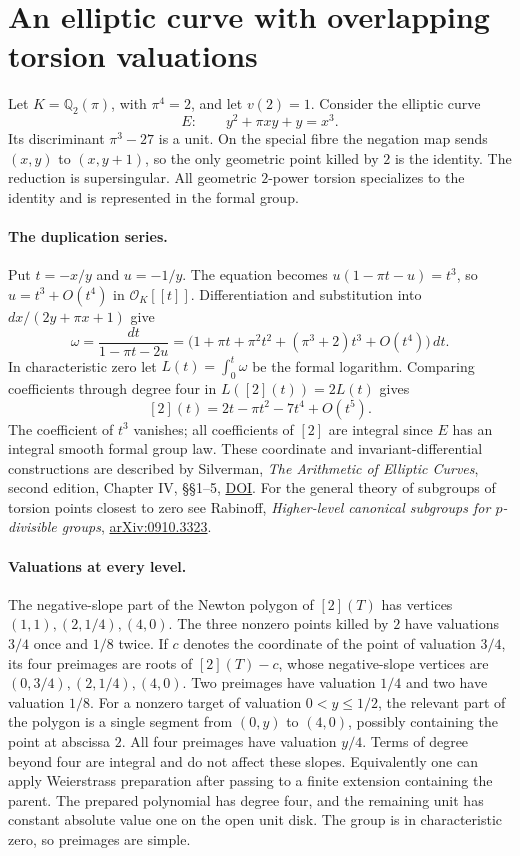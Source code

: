 \section{An elliptic curve with overlapping torsion valuations}
\label{sec:ramified-example}
Let $K=\mathbb Q_2(\pi)$, with $\pi^4=2$, and let $v(2)=1$. Consider the elliptic curve
\[
                 E:\qquad y^2+\pi xy+y=x^3.
\]
Its discriminant $\pi^3-27$ is a unit. On the special fibre the negation map sends $(x,y)$ to $(x,y+1)$, so the only geometric point killed by $2$ is the identity. The reduction is supersingular. All geometric $2$-power torsion specializes to the identity and is represented in the formal group.

\paragraph{The duplication series.}
Put $t=-x/y$ and $u=-1/y$. The equation becomes $u(1-\pi t-u)=t^3$, so $u=t^3+O(t^4)$ in $\mathcal O_K[[t]]$. Differentiation and substitution into $dx/(2y+\pi x+1)$ give
\[
  \omega=\frac{dt}{1-\pi t-2u}
      =\bigl(1+\pi t+\pi^2t^2+(\pi^3+2)t^3+O(t^4)\bigr)\,dt.
\]
In characteristic zero let $L(t)=\int_0^t\omega$ be the formal logarithm. Comparing coefficients through degree four in $L([2](t))=2L(t)$ gives
\[
                [2](t)=2t-\pi t^2-7t^4+O(t^5).
\]
The coefficient of $t^3$ vanishes; all coefficients of $[2]$ are integral since $E$ has an integral smooth formal group law. These coordinate and invariant-differential constructions are described by Silverman, \emph{The Arithmetic of Elliptic Curves}, second edition, Chapter IV, \S\S1--5, \href{https://doi.org/10.1007/978-0-387-09494-6}{DOI}. For the general theory of subgroups of torsion points closest to zero see Rabinoff, \emph{Higher-level canonical subgroups for $p$-divisible groups}, \href{https://arxiv.org/abs/0910.3323}{arXiv:0910.3323}.

\paragraph{Valuations at every level.}
The negative-slope part of the Newton polygon of $[2](T)$ has vertices $(1,1),(2,1/4),(4,0)$. The three nonzero points killed by $2$ have valuations $3/4$ once and $1/8$ twice. If $c$ denotes the coordinate of the point of valuation $3/4$, its four preimages are roots of $[2](T)-c$, whose negative-slope vertices are $(0,3/4),(2,1/4),(4,0)$. Two preimages have valuation $1/4$ and two have valuation $1/8$. For a nonzero target of valuation $0<y\le 1/2$, the relevant part of the polygon is a single segment from $(0,y)$ to $(4,0)$, possibly containing the point at abscissa $2$. All four preimages have valuation $y/4$. Terms of degree beyond four are integral and do not affect these slopes. Equivalently one can apply Weierstrass preparation after passing to a finite extension containing the parent. The prepared polynomial has degree four, and the remaining unit has constant absolute value one on the open unit disk. The group is in characteristic zero, so preimages are simple.


